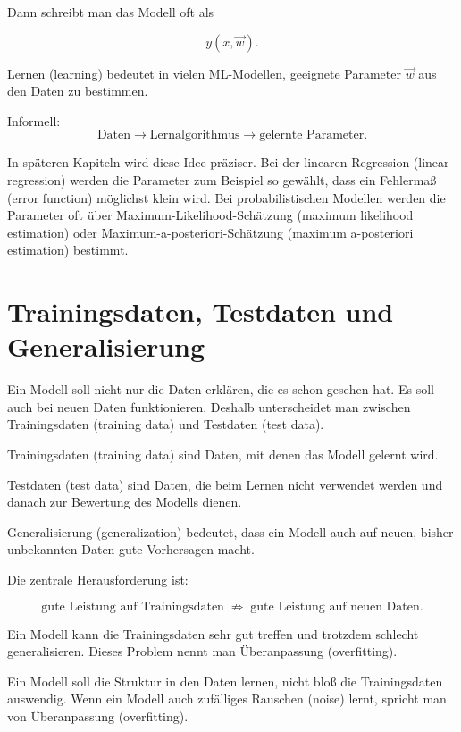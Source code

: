 Dann schreibt man das Modell oft als

\[
    y(x,\vec{w}).
\]

\begin{definitionbox}
Lernen (learning) bedeutet in vielen ML-Modellen, geeignete Parameter \(\vec{w}\) aus den Daten zu bestimmen.

Informell:
\[
    \text{Daten}
    \longrightarrow
    \text{Lernalgorithmus}
    \longrightarrow
    \text{gelernte Parameter}.
\]
\end{definitionbox}

In späteren Kapiteln wird diese Idee präziser.
Bei der linearen Regression (linear regression) werden die Parameter zum Beispiel so gewählt, dass ein Fehlermaß (error function) möglichst klein wird.
Bei probabilistischen Modellen werden die Parameter oft über Maximum-Likelihood-Schätzung (maximum likelihood estimation) oder Maximum-a-posteriori-Schätzung (maximum a-posteriori estimation) bestimmt.

\section{Trainingsdaten, Testdaten und Generalisierung}

Ein Modell soll nicht nur die Daten erklären, die es schon gesehen hat.
Es soll auch bei neuen Daten funktionieren.
Deshalb unterscheidet man zwischen Trainingsdaten (training data) und Testdaten (test data).

\begin{definitionbox}
Trainingsdaten (training data) sind Daten, mit denen das Modell gelernt wird.

Testdaten (test data) sind Daten, die beim Lernen nicht verwendet werden und danach zur Bewertung des Modells dienen.

Generalisierung (generalization) bedeutet, dass ein Modell auch auf neuen, bisher unbekannten Daten gute Vorhersagen macht.
\end{definitionbox}

Die zentrale Herausforderung ist:

\[
    \text{gute Leistung auf Trainingsdaten}
    \;\not\Rightarrow\;
    \text{gute Leistung auf neuen Daten}.
\]

Ein Modell kann die Trainingsdaten sehr gut treffen und trotzdem schlecht generalisieren.
Dieses Problem nennt man Überanpassung (overfitting).

\begin{conceptbox}
Ein Modell soll die Struktur in den Daten lernen, nicht bloß die Trainingsdaten auswendig.
Wenn ein Modell auch zufälliges Rauschen (noise) lernt, spricht man von Überanpassung (overfitting).
\end{conceptbox}

